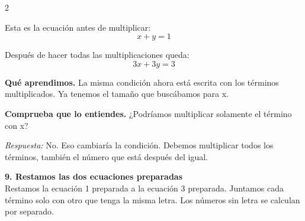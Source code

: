 \documentclass[11pt,a4paper,landscape]{article}
\begin{document}
\begin{multicols*}{2}
\begin{minipage}{\linewidth}
\par\smallskip Esta es la ecuación antes de multiplicar:
\[x + y = 1\]
\par{}\par\smallskip
\par\smallskip Después de hacer todas las multiplicaciones queda:
\[3x + 3y = 3\]
\par\smallskip\textbf{Qué aprendimos.} La misma condición ahora está escrita con los términos multiplicados. Ya tenemos el tamaño que buscábamos para x.
\par\smallskip\textbf{Comprueba que lo entiendes.} ¿Podríamos multiplicar solamente el término con x?\par\textit{Respuesta:} No. Eso cambiaría la condición. Debemos multiplicar todos los términos, también el número que está después del igual.
\end{minipage}\par\medskip
\noindent\begin{minipage}{\linewidth}\textbf{9. Restamos las dos ecuaciones preparadas}\\[2pt]Restamos la ecuación 1 preparada a la ecuación 3 preparada. Juntamos cada término solo con otro que tenga la misma letra. Los números sin letra se calculan por separado.
\par{}\par\smallskip

\end{minipage}
\end{multicols*}
\end{document}
